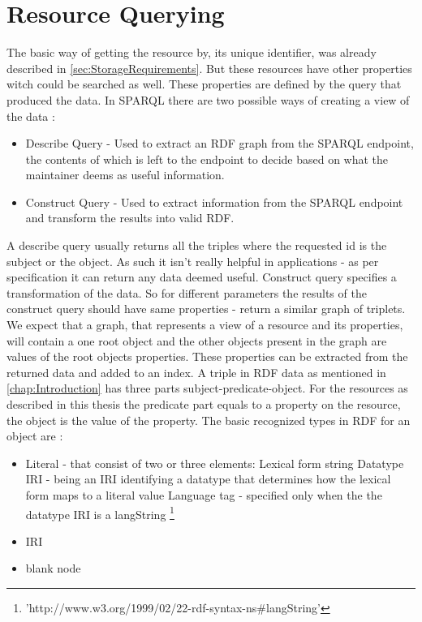 \section{Resource Querying}
\label{sec:ResourceQuerying}
The basic way of getting the resource by, its unique identifier, was already described in \autoref{sec:StorageRequirements}. But these resources have other properties witch could be searched as well. These properties are defined by the query that produced the data. In SPARQL there are two possible ways of creating a view of the data \cite{onlineSparqlQueryLanguageSpec}:
\begin{itemize}
	\item Describe Query - Used to extract an RDF graph from the SPARQL endpoint, the contents of which is left to the endpoint to decide based on what the maintainer deems as useful information.
	\item Construct Query - Used to extract information from the SPARQL endpoint and transform the results into valid RDF.
\end{itemize}
A describe query usually returns all the triples where the requested id is the subject or the object. As such it isn't really helpful in applications - as per specification it can return any data deemed useful.
Construct query specifies a transformation of the data. So for different parameters the results of the construct query should have same properties - return a similar graph of triplets. We expect that a graph, that represents a view of a resource and its properties, will contain a one root object and the other objects present in the graph are values of the root objects properties.
These properties can be extracted from the returned data and added to an index. A triple in RDF data as mentioned in \autoref{chap:Introduction} has three parts subject-predicate-object. For the resources as described in this thesis the predicate part equals to a property on the resource, the object is the value of the property. The basic recognized types in RDF for an object are \cite{onlineRdfConcepts}:
\begin{itemize}
	\item Literal - that consist of two or three elements: %
		\subitem Lexical form string
		\subitem Datatype IRI - being an IRI identifying a datatype that determines how the lexical form maps to a literal value
		\subitem Language tag - specified only when the the datatype IRI is a langString \footnote{'http://www.w3.org/1999/02/22-rdf-syntax-ns\#langString'}
	\item IRI
	\item blank node
\end{itemize}
